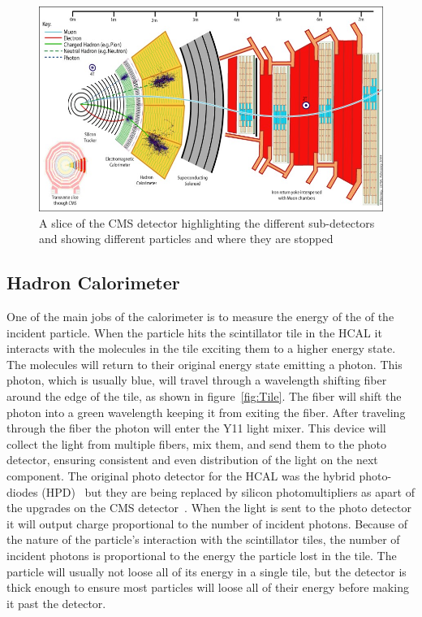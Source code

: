 \begin{figure}
\centering
\includegraphics[width=\linewidth]{Figures/CMSlayout.jpg}
\caption{A slice of the CMS detector highlighting the different sub-detectors and showing different particles and where they are stopped}
\label{fig:CMSlayout}
\end{figure}

\subsection{Hadron Calorimeter}
One of the main jobs of the calorimeter is to measure the energy of the of the incident particle. When the particle hits the scintillator tile in the HCAL it interacts with the molecules in the tile exciting them to a higher energy state. The molecules will return to their original energy state emitting a photon. This photon, which is usually blue, will travel through a wavelength shifting fiber around the edge of the tile, as shown in figure~\ref{fig:Tile}. The fiber will shift the photon into a green wavelength keeping it from exiting the fiber. After traveling through the fiber the photon will enter the Y11 light mixer. This device will collect the light from multiple fibers, mix them, and send them to the photo detector, ensuring consistent and even distribution of the light on the next component. The original photo detector for the HCAL was the hybrid photo-diodes (HPD)~\cite{HPD} but they are being replaced by silicon photomultipliers as apart of the upgrades on the CMS detector~\cite{HCALPhase1}. When the light is sent to the photo detector it will output charge proportional to the number of incident photons. Because of the nature of the particle's interaction with the scintillator tiles, the number of incident photons is proportional to the energy the particle lost in the tile. The particle will usually not loose all of its energy in a single tile, but the detector is thick enough to ensure most particles will loose all of their energy before making it past the detector.

